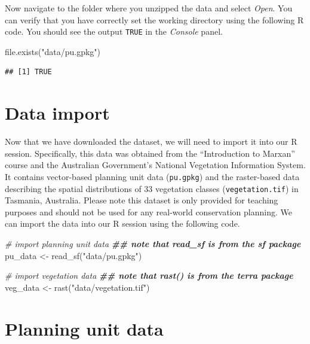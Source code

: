 \documentclass[
  12pt,
]{book}
\newenvironment{Shaded}{\begin{snugshade}}{\end{snugshade}}
\newcommand{\CommentTok}[1]{\textcolor[rgb]{0.56,0.35,0.01}{\textit{#1}}}
\newcommand{\DocumentationTok}[1]{\textcolor[rgb]{0.56,0.35,0.01}{\textbf{\textit{#1}}}}
\newcommand{\FunctionTok}[1]{\textcolor[rgb]{0.00,0.00,0.00}{#1}}
\newcommand{\NormalTok}[1]{#1}
\newcommand{\OtherTok}[1]{\textcolor[rgb]{0.56,0.35,0.01}{#1}}
\newcommand{\StringTok}[1]{\textcolor[rgb]{0.31,0.60,0.02}{#1}}
\begin{document}
\clearpage

Now navigate to the folder where you unzipped the data and select \emph{Open}. You can verify that you have correctly set the working directory using the following R code. You should see the output \texttt{TRUE} in the \emph{Console} panel.

\begin{Shaded}
\begin{Highlighting}[]
\FunctionTok{file.exists}\NormalTok{(}\StringTok{"data/pu.gpkg"}\NormalTok{)}
\end{Highlighting}
\end{Shaded}

\begin{verbatim}
## [1] TRUE
\end{verbatim}

\hypertarget{data-import}{%
\section{Data import}\label{data-import}}

Now that we have downloaded the dataset, we will need to import it into our R session. Specifically, this data was obtained from the ``Introduction to Marxan'' course and the Australian Government's National Vegetation Information System. It contains vector-based planning unit data (\texttt{pu.gpkg}) and the raster-based data describing the spatial distributions of 33 vegetation classes (\texttt{vegetation.tif}) in Tasmania, Australia. Please note this dataset is only provided for teaching purposes and should not be used for any real-world conservation planning. We can import the data into our R session using the following code.

\begin{Shaded}
\begin{Highlighting}[]
\CommentTok{\# import planning unit data}
\DocumentationTok{\#\# note that read\_sf is from the sf package}
\NormalTok{pu\_data }\OtherTok{\textless{}{-}} \FunctionTok{read\_sf}\NormalTok{(}\StringTok{"data/pu.gpkg"}\NormalTok{)}

\CommentTok{\# import vegetation data}
\DocumentationTok{\#\# note that rast() is from the terra package}
\NormalTok{veg\_data }\OtherTok{\textless{}{-}} \FunctionTok{rast}\NormalTok{(}\StringTok{"data/vegetation.tif"}\NormalTok{)}
\end{Highlighting}
\end{Shaded}

\hypertarget{planning-unit-data}{%
\section{Planning unit data}\label{planning-unit-data}}
\end{document}
